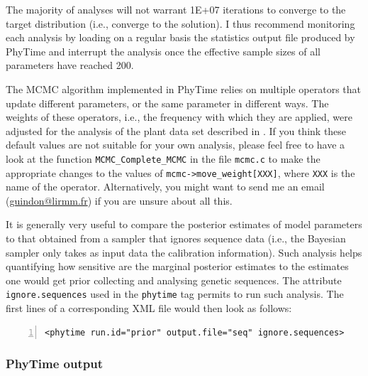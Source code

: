 \documentclass[a4paper,12pt]{article}
\newcommand{\x}[1]{\texttt{#1}}
\begin{document}
The  majority of analyses will not warrant 1E+07 iterations  to converge to the target
distribution (i.e., converge to the solution). I thus recommend  monitoring each analysis by loading
on a regular basis the statistics output file produced by PhyTime and interrupt the analysis once
the effective sample sizes of all parameters have reached 200.  

The MCMC algorithm implemented in
PhyTime relies on multiple operators that update different parameters, or the same parameter in
different ways. The weights of these operators, i.e., the frequency with which they are applied,
were adjusted for the analysis of the plant data set described in \cite{guindon17}. If you think
these default values are not suitable for your own analysis, please feel free to have a look at the
function \x{MCMC\_Complete\_MCMC} in the file \x{mcmc.c} to make  the appropriate changes to the
values of \x{mcmc->move\_weight[XXX]}, where \x{XXX} is the name of the operator. Alternatively, you
might want to send me an email (\url{guindon@lirmm.fr}) if you are unsure about all this. 

It is generally very useful to compare the posterior estimates of model parameters to that obtained
from a sampler that ignores sequence data (i.e., the Bayesian sampler only takes as input data the
calibration information). Such analysis helps quantifying how sensitive are the marginal posterior
estimates to the estimates one would get prior collecting and analysing genetic sequences. The
attribute \x{ignore.sequences} used in the \x{phytime} tag permits to run such analysis. The first
lines of a corresponding XML file would then look as follows:

\vspace{0.2cm}
\begin{Verbatim}[frame=single, label=Sampling from the prior in PhyTime, samepage=true, baselinestretch=0.5,
  fontsize=\small, numbers=left]
<phytime run.id="prior" output.file="seq" ignore.sequences>
\end{Verbatim}

\subsubsection{PhyTime output}
\end{document}
